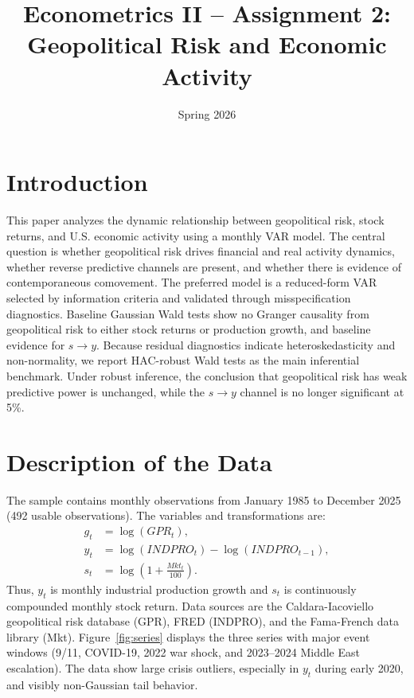 \documentclass[12pt]{article}
\title{Econometrics II -- Assignment 2:\\
Geopolitical Risk and Economic Activity}
\date{Spring 2026}
\begin{document}
\maketitle
\section{Introduction}
This paper analyzes the dynamic relationship between geopolitical risk, stock returns, and U.S. economic activity using a monthly VAR model. The central question is whether geopolitical risk drives financial and real activity dynamics, whether reverse predictive channels are present, and whether there is evidence of contemporaneous comovement.
\newline
\newline
The preferred model is a reduced-form VAR selected by information criteria and validated through misspecification diagnostics. Baseline Gaussian Wald tests show no Granger causality from geopolitical risk to either stock returns or production growth, and baseline evidence for $s\rightarrow y$. Because residual diagnostics indicate heteroskedasticity and non-normality, we report HAC-robust Wald tests as the main inferential benchmark. Under robust inference, the conclusion that geopolitical risk has weak predictive power is unchanged, while the $s\rightarrow y$ channel is no longer significant at 5\%.


\section{Description of the Data}

The sample contains monthly observations from January 1985 to December 2025 (492 usable observations). The variables and transformations are:
\begin{align*}
g_t &= \log(GPR_t), \\
y_t &= \log(INDPRO_t)-\log(INDPRO_{t-1}), \\
s_t &= \log\left(1+\frac{Mkt_t}{100}\right).
\end{align*}
Thus, $y_t$ is monthly industrial production growth and $s_t$ is continuously compounded monthly stock return.
\newline
Data sources are the Caldara-Iacoviello geopolitical risk database (GPR), FRED (INDPRO), and the Fama-French data library (Mkt).
\newline
\newline
Figure~\ref{fig:series} displays the three series with major event windows (9/11, COVID-19, 2022 war shock, and 2023--2024 Middle East escalation). The data show large crisis outliers, especially in $y_t$ during early 2020, and visibly non-Gaussian tail behavior.
\end{document}
